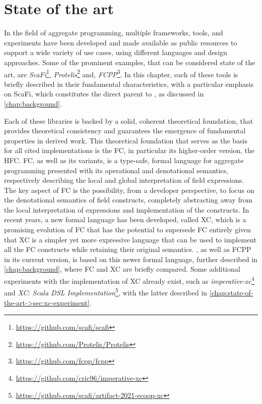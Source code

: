 \chapter{State of the art}
\label{chap:state-of-the-art}

In the field of aggregate programming\cite{aggregate-programming}, multiple frameworks, tools, and experiments have been developed and made available as public resources to support a wide variety of use cases, using different languages and design approaches.
%
Some of the prominent examples, that can be considered state of the art, are \textit{ScaFi}\footnote{\url{https://github.com/scafi/scafi}}\cite{scafi}, \textit{Protelis}\footnote{\url{https://github.com/Protelis/Protelis}}\cite{protelis} and, \textit{FCPP}\footnote{\url{https://github.com/fcpp/fcpp}}\cite{fcpp}.
%
In this chapter, each of these tools is briefly described in their fundamental characteristics, with a particular emphasis on ScaFi, which constitutes the direct parent to \this, as discussed in \cref{chap:background}.

Each of these libraries is backed by a solid, coherent theoretical foundation, that provides theoretical consistency and guarantees the emergence of fundamental properties in derived work.
%
This theoretical foundation that serves as the basis for all cited implementations is the \ac{FC}\cite{fc}, in particular its higher-order version, the \ac{HFC}\cite{hofc}.
%
\ac{FC}, as well as its variants, is a type-safe, formal language for aggregate programming\cite{fc, from-dc-to-fc-and-ap} presented with its operational and denotational semantics, respectively describing the local and global interpretation of field expressions\cite{from-dc-to-fc-and-ap}.
%
The key aspect of \ac{FC} is the possibility, from a developer perspective, to focus on the denotational semantics of field constructs, completely abstracting away from the local interpretation of expressions and implementation of the constructs.
%
In recent years, a new formal language has been developed, called \ac{XC}\cite{xc}, which is a promising evolution of \ac{FC} that has the potential to supersede \ac{FC} entirely given that \ac{XC} is a simpler yet more expressive language that can be used to implement all the \ac{FC} constructs while retaining their original semantics.
%
\this, as well as FCPP in its current version, is based on this newer formal language, further described in \cref{chap:background}, where \ac{FC} and \ac{XC} are briefly compared.
%
Some additional experiments with the implementation of \ac{XC} already exist, such as \textit{imperative-xc}\footnote{\url{https://github.com/cric96/imperative-xc}} and \textit{XC: Scala DSL Implementation}\footnote{\url{https://github.com/scafi/artifact-2021-ecoop-xc}}\cite{xc-experiment-with-scafi}, with the latter described in \cref{chap:state-of-the-art->sec:xc-experiment}.

